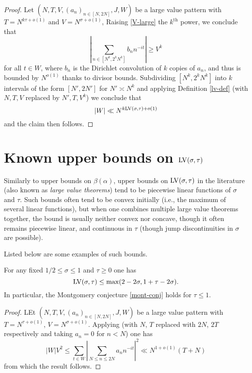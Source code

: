 \begin{proof} Let  $(N,T,V,(a_n)_{n \in [N,2N]},J,W)$ be a large value pattern with $T = N^{k\tau+o(1)}$ and $V = N^{\sigma+o(1)}$, Raising \eqref{V-large} the $k^{\mathrm{th}}$ power, we conclude that
$$ \left|\sum_{n \in [N^k,2^kN^k]} b_n n^{-it} \right| \geq V^k$$
for all $t \in W$, where $b_n$ is the Dirichlet convolution of $k$ copies of $a_n$, and thus is bounded by $N^{o(1)}$ thanks to divisor bounds.  Subdividing $[N^k, 2^k N^k]$ into $k$ intervals of the form $[N',2N']$ for $N' \asymp N^k$ and applying Definition \ref{lv-def} (with $N, T, V$ replaced by $N', T, V^k$) we conclude that
$$ |W| \ll N^{k \mathrm{LV}(\sigma,\tau) + o(1)}$$
and the claim then follows.
\end{proof}

\section{Known upper bounds on \texorpdfstring{$\mathrm{LV}(\sigma,\tau)$}{LV(sigma,tau)}}

Similarly to upper bounds on $\beta(\alpha)$, upper bounds on $\mathrm{LV}(\sigma,\tau)$ in the literature (also known as \emph{large value theorems}) tend to be piecewise linear functions of $\sigma$ and $\tau$.  Such bounds often tend to be convex initially (i.e., the maximum of several linear functions), but when one combines multiple large value theorems together, the bound is usually neither convex nor concave, though it often remains piecewise linear, and continuous in $\tau$ (though jump discontinuities in $\sigma$ are possible).

Listed below are some examples of such bounds.

\begin{theorem}\label{l2-mvt} For any fixed $1/2 \leq \sigma \leq 1$ and $\tau\geq 0$ one has
    $$ \mathrm{LV}(\sigma,\tau) \leq \max( 2-2\sigma, 1 + \tau - 2 \sigma).$$
In particular, the Montgomery conjecture \eqref{mont-conj} holds for $\tau \leq 1$.
\end{theorem}


\begin{proof}
LEt $(N,T,V,(a_n)_{n \in [N,2N]},J,W)$ be a large value pattern with $T = N^{\tau + o(1)}$, $V = N^{\sigma + o(1)}$. Applying \cite[Theorem~9.4]{ik} (with $N$, $T$ replaced with $2N$, $2T$ respectively and taking $a_n = 0$ for $n < N$) one has
\[
|W|V^2 \le \sum_{t \in W} \left|\sum_{N \le n \le 2N} a_n n^{-it}\right|^2 \ll N^{1 + o(1)}(T + N)
\]
from which the result follows.
\end{proof}

